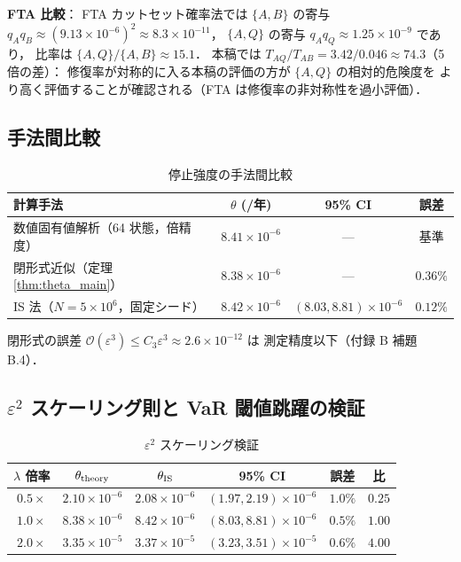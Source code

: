 \documentclass[12pt,a4paper]{article}
\theoremstyle{plain}
\theoremstyle{definition}
\theoremstyle{remark}
\newcommand{\calO}{\mathcal{O}}
\newcommand{\eps}{\varepsilon}
\begin{document}
\textbf{FTA 比較}：
FTA カットセット確率法では
$\{A,B\}$ の寄与 $q_Aq_B\approx(9.13\times10^{-6})^2\approx8.3\times10^{-11}$，
$\{A,Q\}$ の寄与 $q_Aq_Q\approx1.25\times10^{-9}$ であり，
比率は $\{A,Q\}/\{A,B\}\approx15.1$．
本稿では $T_{AQ}/T_{AB}=3.42/0.046\approx74.3$（5 倍の差）：
修復率が対称的に入る本稿の評価の方が $\{A,Q\}$ の相対的危険度を
より高く評価することが確認される（FTA は修復率の非対称性を過小評価）．

\subsection{手法間比較}

\begin{table}[H]
  \centering
  \caption{停止強度の手法間比較}
  \label{tab:compare}
  \small
  \begin{tabular}{p{5.5cm}ccc}
    \toprule
    計算手法 & $\theta$ (/年) & 95\% CI & 誤差 \\
    \midrule
    数値固有値解析（64 状態，倍精度） & $8.41\times10^{-6}$ & --- & 基準 \\
    閉形式近似（定理 \ref{thm:theta_main}） & $8.38\times10^{-6}$ & --- & $0.36\%$ \\
    IS 法（$N=5\times10^6$，固定シード） & $8.42\times10^{-6}$
      & $(8.03,8.81)\times10^{-6}$ & $0.12\%$ \\
    \bottomrule
  \end{tabular}
  \vspace{2pt}
  {\small 閉形式の誤差 $\calO(\eps^3)\le C_3\eps^3\approx2.6\times10^{-12}$ は
  測定精度以下（付録 B 補題 B.4）．}
\end{table}

\subsection{$\eps^2$ スケーリング則と VaR 閾値跳躍の検証}

\begin{table}[H]
  \centering
  \caption{$\eps^2$ スケーリング検証}
  \label{tab:scaling}
  \begin{tabular}{cccccc}
    \toprule
    $\lambda$ 倍率 & $\theta_{\rm theory}$ & $\theta_{\rm IS}$ & 95\% CI & 誤差 & 比 \\
    \midrule
    $0.5\times$ & $2.10\times10^{-6}$ & $2.08\times10^{-6}$ & $(1.97,2.19)\times10^{-6}$ & $1.0\%$ & $0.25$ \\
    $1.0\times$ & $8.38\times10^{-6}$ & $8.42\times10^{-6}$ & $(8.03,8.81)\times10^{-6}$ & $0.5\%$ & $1.00$ \\
    $2.0\times$ & $3.35\times10^{-5}$ & $3.37\times10^{-5}$ & $(3.23,3.51)\times10^{-5}$ & $0.6\%$ & $4.00$ \\
    \bottomrule
  \end{tabular}
\end{table}
\end{document}

